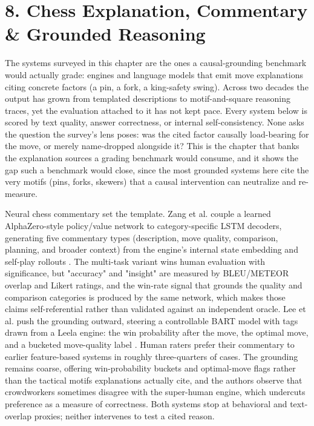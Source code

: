 \documentclass[conference]{IEEEtran}
\begin{document}
\section*{8. Chess Explanation, Commentary \& Grounded Reasoning}
The systems surveyed in this chapter are the ones a causal-grounding benchmark would actually grade: engines and language models that emit move explanations citing concrete factors (a pin, a fork, a king-safety swing). Across two decades the output has grown from templated descriptions to motif-and-square reasoning traces, yet the evaluation attached to it has not kept pace. Every system below is scored by text quality, answer correctness, or internal self-consistency. None asks the question the survey's lens poses: was the cited factor causally load-bearing for the move, or merely name-dropped alongside it? This is the chapter that banks the explanation sources a grading benchmark would consume, and it shows the gap such a benchmark would close, since the most grounded systems here cite the very motifs (pins, forks, skewers) that a causal intervention can neutralize and re-measure.

Neural chess commentary set the template. Zang et al. couple a learned AlphaZero-style policy/value network to category-specific LSTM decoders, generating five commentary types (description, move quality, comparison, planning, and broader context) from the engine's internal state embedding and self-play rollouts \cite{ref22}. The multi-task variant wins human evaluation with significance, but "accuracy" and "insight" are measured by BLEU/METEOR overlap and Likert ratings, and the win-rate signal that grounds the quality and comparison categories is produced by the same network, which makes those claims self-referential rather than validated against an independent oracle. Lee et al. push the grounding outward, steering a controllable BART model with tags drawn from a Leela engine: the win probability after the move, the optimal move, and a bucketed move-quality label \cite{ref21}. Human raters prefer their commentary to earlier feature-based systems in roughly three-quarters of cases. The grounding remains coarse, offering win-probability buckets and optimal-move flags rather than the tactical motifs explanations actually cite, and the authors observe that crowdworkers sometimes disagree with the super-human engine, which undercuts preference as a measure of correctness. Both systems stop at behavioral and text-overlap proxies; neither intervenes to test a cited reason.
\end{document}
